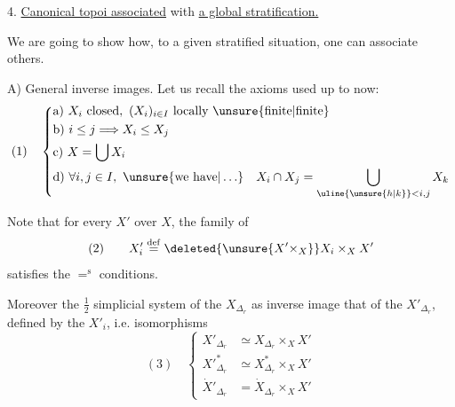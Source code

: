 4. \uline{Canonical topoi associated} with \uline{a global
stratification.}

We are going to show how, to a given
stratified situation, one can associate others.

A) General inverse images. Let us recall the
axioms used up to now:
\[
(1)\quad\left\{\begin{aligned}
&\text{a) }X_i\text{ closed},\ (X_i)_{i\in I}\text{ locally \unsure{finite|finite}}\\
&\text{b) }i\leq j\Longrightarrow X_i\leq X_j\\
&\text{c) }X=\bigcup X_i\\
&\text{d) }\forall i,j\in I,\ \unsure{\text{we have}|\ldots}\quad X_i\cap X_j=\bigcup_{\uline{\unsure{h|k}}<i,j}X_k
\end{aligned}\right.
\]

Note that for every $X'$ over
$X$, the family of
\[
(2)\qquad X'_i\overset{\mathrm{def}}=\deleted{\unsure{X'\times_X}}X_i\times_X X'
\]
satisfies the  $=^{\mathrm s}$ conditions.

Moreover the $\frac12$ simplicial system of the
$X_{\Delta_r}$  as inverse image that
of the $X'_{\Delta_r}$, defined by the $X'_i$,
 i.e. isomorphisms
\[
(3)\quad\left\{\begin{aligned}
X'_{\Delta_r}&\simeq X_{\Delta_r}\times_X X'\\
X'^{*}_{\Delta_r}&\simeq X^*_{\Delta_r}\times_X X'\\
\dot X'_{\Delta_r}&=\dot X_{\Delta_r}\times_X X'
\end{aligned}\right.
\]

